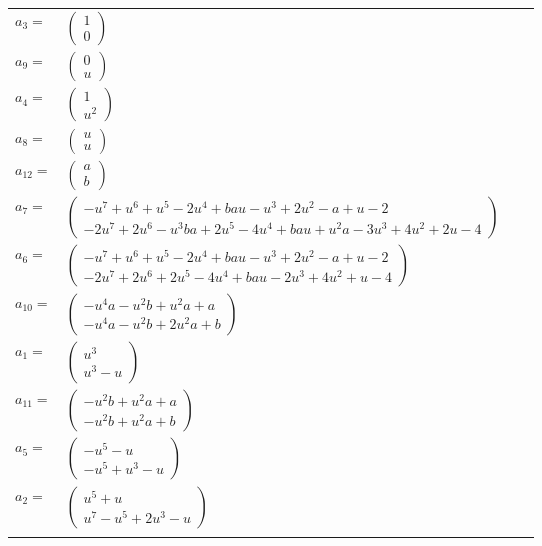 \documentclass[1p]{elsarticle_modified}
\theoremstyle{definition}
\begin{document}
\begin{tabular}{m{7pt} m{180pt} m{7pt} m{180pt} }
\flushright $a_{3}=$&$\begin{pmatrix}1\\0\end{pmatrix}$ \\
\flushright $a_{9}=$&$\begin{pmatrix}0\\u\end{pmatrix}$ \\
\flushright $a_{4}=$&$\begin{pmatrix}1\\u^2\end{pmatrix}$ \\
\flushright $a_{8}=$&$\begin{pmatrix}u\\u\end{pmatrix}$ \\
\flushright $a_{12}=$&$\begin{pmatrix}a\\b\end{pmatrix}$ \\
\flushright $a_{7}=$&$\begin{pmatrix}- u^7+u^6+u^5-2 u^4+b a u- u^3+2 u^2- a+u-2\\-2 u^7+2 u^6- u^3 b a+2 u^5-4 u^4+b a u+u^2 a-3 u^3+4 u^2+2 u-4\end{pmatrix}$ \\
\flushright $a_{6}=$&$\begin{pmatrix}- u^7+u^6+u^5-2 u^4+b a u- u^3+2 u^2- a+u-2\\-2 u^7+2 u^6+2 u^5-4 u^4+b a u-2 u^3+4 u^2+u-4\end{pmatrix}$ \\
\flushright $a_{10}=$&$\begin{pmatrix}- u^4 a- u^2 b+u^2 a+a\\- u^4 a- u^2 b+2 u^2 a+b\end{pmatrix}$ \\
\flushright $a_{1}=$&$\begin{pmatrix}u^3\\u^3- u\end{pmatrix}$ \\
\flushright $a_{11}=$&$\begin{pmatrix}- u^2 b+u^2 a+a\\- u^2 b+u^2 a+b\end{pmatrix}$ \\
\flushright $a_{5}=$&$\begin{pmatrix}- u^5- u\\- u^5+u^3- u\end{pmatrix}$ \\
\flushright $a_{2}=$&$\begin{pmatrix}u^5+u\\u^7- u^5+2 u^3- u\end{pmatrix}$\\&\end{tabular}
\end{document}

